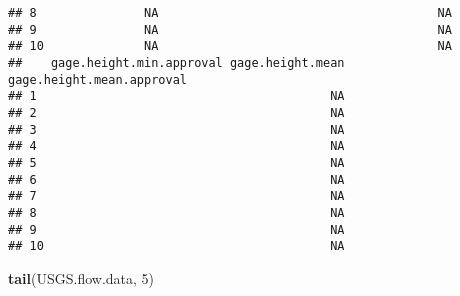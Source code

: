 \documentclass[]{article}
\newenvironment{Shaded}{\begin{snugshade}}{\end{snugshade}}
\newcommand{\DecValTok}[1]{\textcolor[rgb]{0.00,0.00,0.81}{#1}}
\newcommand{\KeywordTok}[1]{\textcolor[rgb]{0.13,0.29,0.53}{\textbf{#1}}}
\newcommand{\NormalTok}[1]{#1}
\begin{document}
\begin{verbatim}
## 8               NA                                       NA
## 9               NA                                       NA
## 10              NA                                       NA
##    gage.height.min.approval gage.height.mean gage.height.mean.approval
## 1                                         NA                          
## 2                                         NA                          
## 3                                         NA                          
## 4                                         NA                          
## 5                                         NA                          
## 6                                         NA                          
## 7                                         NA                          
## 8                                         NA                          
## 9                                         NA                          
## 10                                        NA
\end{verbatim}

\begin{Shaded}
\begin{Highlighting}[]
\KeywordTok{tail}\NormalTok{(USGS.flow.data, }\DecValTok{5}\NormalTok{)}
\end{Highlighting}
\end{Shaded}
\end{document}
